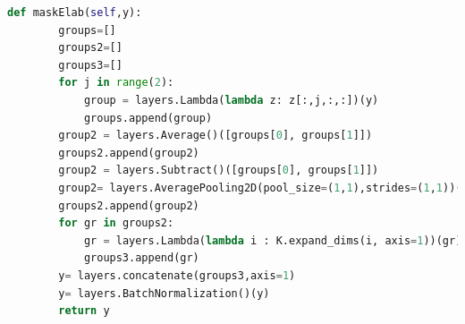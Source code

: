 \documentclass[%
 reprint,
 amsmath,amssymb,
 aps,
]{revtex4-1}
\begin{document}
\begin{lstlisting}[linewidth=\columnwidth,breaklines=true,language=python]
def maskElab(self,y):
        groups=[]
        groups2=[]
        groups3=[] 
        for j in range(2):
            group = layers.Lambda(lambda z: z[:,j,:,:])(y) 
            groups.append(group)          
        group2 = layers.Average()([groups[0], groups[1]])
        groups2.append(group2)         
        group2 = layers.Subtract()([groups[0], groups[1]])
        group2= layers.AveragePooling2D(pool_size=(1,1),strides=(1,1))(group2)  
        groups2.append(group2)       
        for gr in groups2:
            gr = layers.Lambda(lambda i : K.expand_dims(i, axis=1))(gr)
            groups3.append(gr)
        y= layers.concatenate(groups3,axis=1)
        y= layers.BatchNormalization()(y)  
        return y

\end{lstlisting}
\end{document}

